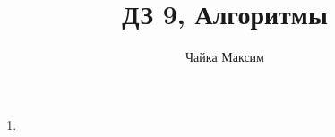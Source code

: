 \documentclass[12pt]{article}
\title{ДЗ 9, Алгоритмы}
\author{Чайка Максим}
\begin{document}
\maketitle

\begin{enumerate}
\item 
\end{enumerate}
\end{document}
